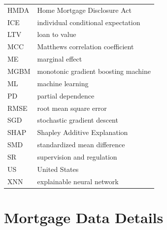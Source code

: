 \documentclass[information,article,accept,moreauthors,pdftex]{Definitions/mdpi}
\begin{document}
{\noindent 
\begin{tabular}{@{}ll}
HMDA & Home Mortgage Disclosure Act\\%
ICE & individual conditional expectation\\%
LTV & loan to value\\ %
MCC & Matthews correlation coefficient\\%
ME & marginal effect\\ %
MGBM & monotonic gradient boosting machine\\
ML & machine learning\\ %
PD & partial dependence\\ %
RMSE & root mean square error\\ %
SGD & stochastic gradient descent\\%
SHAP & Shapley Additive Explanation\\ %
SMD & standardized mean difference\\ %
SR & supervision and regulation\\ %
US & United States\\ 
XNN & explainable neural network 
\end{tabular}}

\vspace{6pt} 

\appendix

\section{Mortgage Data Details}\label{a_sec:mort}
\end{document}
